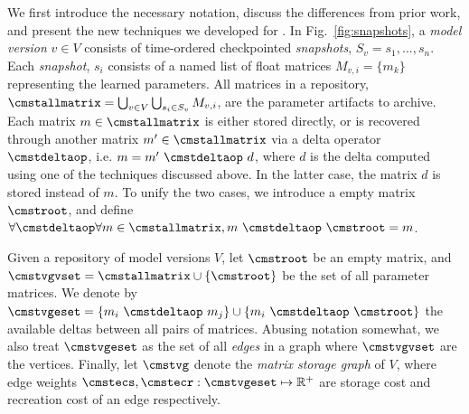 \documentclass[conference]{IEEEtran}
\begin{document}


We first introduce the necessary notation, discuss the differences from prior work, and present the new techniques we developed for \weightstore.
In Fig.~\ref{fig:snapshots}, a \emph{model version} $v \in V$ consists of time-ordered checkpointed \emph{snapshots}, $S_v = {s_1, ..., s_n}$. Each \emph{snapshot}, $s_i$ consists of a named list of float matrices $M_{v,i} = \{m_k\}$ representing the learned parameters. All matrices in a repository, $\cmstallmatrix = \bigcup_{v \in V} \bigcup_{s_i \in S_v} { M_{v,i} } $, are the parameter artifacts to archive. Each matrix $m \in \cmstallmatrix$ is either stored directly, or is recovered through another matrix $m' \in \cmstallmatrix$ via a delta operator $\cmstdeltaop$, i.e. $m = m'\ \cmstdeltaop\ d$, where $d$ is the delta computed using one of the techniques discussed above. In the latter case, the matrix $d$ is stored instead of $m$. To unify the two cases, we introduce a empty matrix $\cmstroot$, and define $\forall \cmstdeltaop\forall m \in \cmstallmatrix, m\ \cmstdeltaop\ \cmstroot = m$.

\begin{definition} Given a repository of model versions $V$, let $\cmstroot$ be an empty matrix, and $\cmstvgvset = \cmstallmatrix \cup \{\cmstroot\}$ be the set of all parameter matrices. We denote by $\cmstvgeset = \{m_i\ \cmstdeltaop\ m_j \} \cup \{ m_i\ \cmstdeltaop\ \cmstroot\}$ the available deltas between all pairs of matrices. Abusing notation somewhat, we also treat $\cmstvgeset$ as the set of all {\em edges} in a graph where $\cmstvgvset$ are the vertices. Finally, let $\cmstvg$ denote the {\em matrix storage graph} of $V$, 
where edge weights $\cmstecs, \cmstecr: \cmstvgeset \mapsto \mathbb{R^+}$ are storage cost and recreation cost of an edge respectively.
\end{definition}
\end{document}
